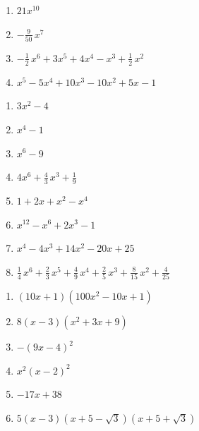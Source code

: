 \documentclass{ximera}
\begin{document}
\begin{Antwoord} \label{antw4.1}
\begin{enumerate}

\item
\hyperlink{oef4.1}{$21x^{10}$}
\item
\hyperlink{oef4.1}{$-\frac{9}{50}\,x^7$}
\item
\hyperlink{oef4.1}{$-\frac{1}{2}\,x^6 + 3x^5 + 4x^4 - x^3 + \frac{1}{2}\,x^2$}
\item
\hyperlink{oef4.1}{$x^5 - 5x^4 + 10x^3 - 10x^2 + 5x - 1$}
\end{enumerate}
\end{Antwoord}

\begin{Antwoord} \label{antw4.2}
\begin{enumerate}
\item
\hyperlink{oef4.2}{$3x^2 - 4$}
\item
\hyperlink{oef4.2}{$x^4-1$}
\item
\hyperlink{oef4.2}{$x^6-9$}
\item
\hyperlink{oef4.2}{$4x^6 + \frac{4}{3}\,x^3+\frac{1}{9}$}
\item
\hyperlink{oef4.2}{$1 + 2x + x^2 - x^4$}
\item
\hyperlink{oef4.2}{$x^{12}-x^6+2x^3 - 1$}
\item
\hyperlink{oef4.2}{$x^4 - 4x^3 + 14x^2 - 20x + 25$}
\item
\hyperlink{oef4.2}{$\frac{1}{4}\,x^6 + \frac{2}{3}\,x^5 + \frac{4}{9}\,x^4 + \frac{2}{5}\,x^3 + \frac{8}{15}\,x^2 + \frac{4}{25}$}
\end{enumerate}
\end{Antwoord}

\begin{Antwoord} \label{antw4.3}
\begin{enumerate}
\item
\hyperlink{oef4.3}{$(10x+1)(100x^2 - 10x + 1)$}
\item
\hyperlink{oef4.3}{$8(x-3)(x^2 + 3x + 9)$}
\item
\hyperlink{oef4.3}{$-(9x-4)^2$}
\item
\hyperlink{oef4.3}{$x^2(x-2)^2$}
\item
\hyperlink{oef4.3}{$-17x+38$}
\item
\hyperlink{oef4.3}{$5(x-3)(x+5-\sqrt{3})(x+5+\sqrt{3})$}
\end{enumerate}
\end{Antwoord}
\end{document}
